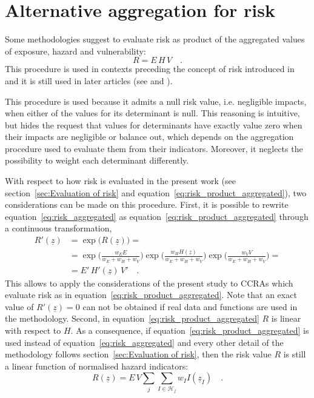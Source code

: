 \section{Alternative aggregation for risk}
Some methodologies suggest to evaluate \gls{risk} as product of the aggregated values of \gls{exposure}, \gls{hazard} and \gls{vulnerability}:
\begin{equation}
  \label{eq:risk_product_aggregated}
  R = E \, H \, V
  \quad .
\end{equation}
This procedure is used in contexts preceding the concept of \gls{risk} introduced in \cite{2012FieldManagingThe} and it is still used in later articles (see \cite[7]{2023DeVivoApplicationOf} and \cite[6]{2023DeVivoClimate-RiskAssessment}).

This procedure is used because it admits a null \gls{risk} value, i.e. negligible \glspl{impact}, when either of the values for its \gls{determinant} is null. This reasoning is intuitive, but hides the request that values for \glspl{determinant} have exactly value zero when their \glspl{impact} are negligible or balance out, which depends on the aggregation procedure used to evaluate them from their \glspl{indicator}. Moreover, it neglects the possibility to weight each \gls{determinant} differently.

With respect to how \gls{risk} is evaluated in the present work (see section~\ref{sec:Evaluation of risk} and equation~\eqref{eq:risk_product_aggregated}), two considerations can be made on this procedure.
First, it is possible to rewrite equation~\eqref{eq:risk_aggregated} as equation~\eqref{eq:risk_product_aggregated} through a continuous transformation,
\begin{equation}
  \label{eq:risk_equivalence}
  \begin{split}
    R'(\underline{z}) & = \exp{\big( R(\underline{z}) \big)} = \\
    & = \exp{\bigg( \frac{w_E E}{w_E + w_H + w_V} \bigg)} \exp{\bigg( \frac{w_H H(\underline{z})}{w_E + w_H + w_V} \bigg)} \exp{\bigg( \frac{w_V V}{w_E + w_H + w_V} \bigg)} = \\
    & = E' \, H'(\underline{z}) \, V'
    \quad .
  \end{split}
\end{equation}
This allows to apply the considerations of the present study to \glspl{CCRA} which evaluate \gls{risk} as in equation~\eqref{eq:risk_product_aggregated}. Note that an exact value of $R'(\underline{z}) = 0$ can not be obtained if real data and functions are used in the methodology.
Second, in equation~\eqref{eq:risk_product_aggregated} $R$ is linear with respect to $H$. As a consequence, if equation~\eqref{eq:risk_product_aggregated} is used instead of equation~\eqref{eq:risk_aggregated} and every other detail of the methodology follows section~\ref{sec:Evaluation of risk}, then the \gls{risk} value $R$ is still a linear function of normalised \gls{hazard} \glspl{indicator}:
\begin{equation}
  \label{eq:risk_product_linearity}
  R(\underline{z}) = E \, V \sum_j \sum_{I \in \mathcal{H}_j} w_I I(\underline{z}_I)
  \quad .
\end{equation}



